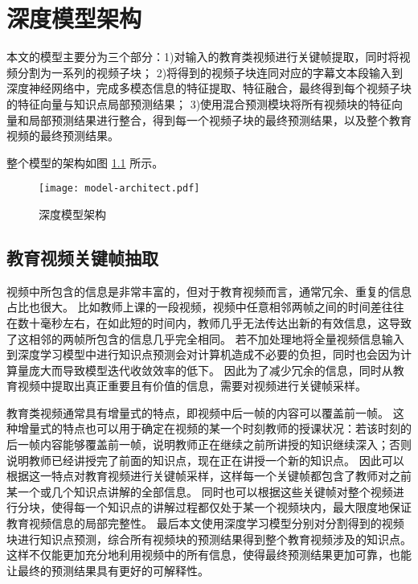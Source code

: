 \chapter{深度模型架构}
    本文的模型主要分为三个部分：1)对输入的教育类视频进行关键帧提取，同时将视频分割为一系列的视频子块；
    2)将得到的视频子块连同对应的字幕文本段输入到深度神经网络中，完成多模态信息的特征提取、特征融合，最终得到每个视频子块的特征向量与知识点局部预测结果；
    3)使用混合预测模块将所有视频块的特征向量和局部预测结果进行整合，得到每一个视频子块的最终预测结果，以及整个教育视频的最终预测结果。

    整个模型的架构如图 \ref{fig3.1} 所示。
    
    \begin{figure}[t]
        \centering
        \texttt{[image: model-architect.pdf]}
        \caption{深度模型架构}
        \label{fig3.1}
    \end{figure}

\section{教育视频关键帧抽取}
    视频中所包含的信息是非常丰富的，但对于教育视频而言，通常冗余、重复的信息占比也很大。
    比如教师上课的一段视频，视频中任意相邻两帧之间的时间差往往在数十毫秒左右，在如此短的时间内，教师几乎无法传达出新的有效信息，这导致了这相邻的两帧所包含的信息几乎完全相同。
    若不加处理地将全量视频信息输入到深度学习模型中进行知识点预测会对计算机造成不必要的负担，同时也会因为计算量庞大而导致模型迭代收敛效率的低下。
    因此为了减少冗余的信息，同时从教育视频中提取出真正重要且有价值的信息，需要对视频进行关键帧采样。

    教育类视频通常具有增量式\cite{Wang2020FineGrainedSM}的特点，即视频中后一帧的内容可以覆盖前一帧。
    这种增量式的特点也可以用于确定在视频的某一个时刻教师的授课状况：若该时刻的后一帧内容能够覆盖前一帧，说明教师正在继续之前所讲授的知识继续深入；否则说明教师已经讲授完了前面的知识点，现在正在讲授一个新的知识点。
    因此可以根据这一特点对教育视频进行关键帧采样，这样每一个关键帧都包含了教师对之前某一个或几个知识点讲解的全部信息。
    同时也可以根据这些关键帧对整个视频进行分块，使得每一个知识点的讲解过程都仅处于某一个视频块内，最大限度地保证教育视频信息的局部完整性。
    最后本文使用深度学习模型分别对分割得到的视频块进行知识点预测，综合所有视频块的预测结果得到整个教育视频涉及的知识点。
    这样不仅能更加充分地利用视频中的所有信息，使得最终预测结果更加可靠，也能让最终的预测结果具有更好的可解释性。

